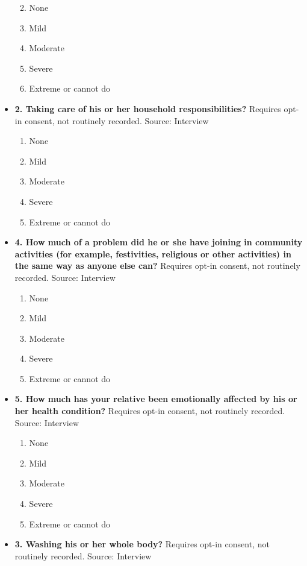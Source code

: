 \documentclass[
]{scrartcl}
\providecommand{\tightlist}{%
  \setlength{\itemsep}{0pt}\setlength{\parskip}{0pt}}\usepackage{longtable,booktabs,array}
\begin{document}
\begin{itemize}
  \begin{enumerate}
  \def\labelenumi{\arabic{enumi}.}
  \tightlist
  \item
    None
  \item
    Mild
  \item
    Moderate
  \item
    Severe
  \item
    Extreme or cannot do
  \end{enumerate}
\item
  \textbf{2. Taking care of his or her household responsibilities?}
  Requires opt-in consent, not routinely recorded. Source: Interview

  \begin{enumerate}
  \def\labelenumi{\arabic{enumi}.}
  \tightlist
  \item
    None
  \item
    Mild
  \item
    Moderate
  \item
    Severe
  \item
    Extreme or cannot do
  \end{enumerate}
\item
  \textbf{4. How much of a problem did he or she have joining in
  community activities (for example, festivities, religious or other
  activities) in the same way as anyone else can?} Requires opt-in
  consent, not routinely recorded. Source: Interview

  \begin{enumerate}
  \def\labelenumi{\arabic{enumi}.}
  \tightlist
  \item
    None
  \item
    Mild
  \item
    Moderate
  \item
    Severe
  \item
    Extreme or cannot do
  \end{enumerate}
\item
  \textbf{5. How much has your relative been emotionally affected by his
  or her health condition?} Requires opt-in consent, not routinely
  recorded. Source: Interview

  \begin{enumerate}
  \def\labelenumi{\arabic{enumi}.}
  \tightlist
  \item
    None
  \item
    Mild
  \item
    Moderate
  \item
    Severe
  \item
    Extreme or cannot do
  \end{enumerate}
\item
  \textbf{3. Washing his or her whole body?} Requires opt-in consent,
  not routinely recorded. Source: Interview


\end{itemize}
\end{document}
